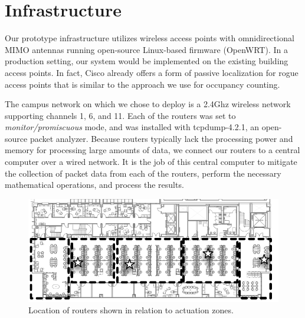 \section{Infrastructure}
Our prototype infrastructure utilizes wireless access points with omnidirectional MIMO antennas running open-source Linux-based firmware (OpenWRT). In a production setting, our system would be implemented on the existing building access points. In fact, Cisco already offers a form of passive localization for rogue access points that is similar to the approach we use for occupancy counting.

The campus network on which we chose to deploy is a 2.4Ghz wireless network supporting channels 1, 6, and 11. Each of the routers was set to \emph{monitor/promiscuous} mode, and was installed with tcpdump-4.2.1, an open-source packet analyzer. Because routers typically lack the processing power and memory for processing large amounts of data, we connect our routers to a central computer over a wired network. It is the job of this central computer to mitigate the collection of packet data from each of the routers, perform the necessary mathematical operations, and process the results. 

\begin{figure}[htb]
\begin{center}
\includegraphics[width=.9\linewidth]{figs/floormap}
\end{center}
\caption{Location of routers shown in relation to actuation zones.}
\label{fig:floormap}
\end{figure}


